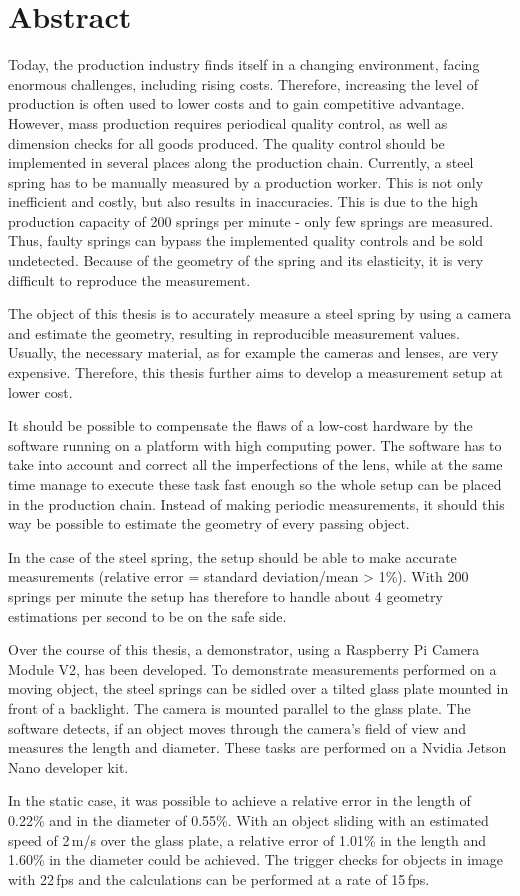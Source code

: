 \chapter*{Abstract}

Today, the production industry finds itself in a changing environment, facing enormous challenges, including rising costs.
Therefore, increasing the level of production is often used to lower costs and to gain competitive advantage. However, mass production requires periodical quality control, as well as dimension checks for all goods produced. 
The quality control should be implemented in several places along the production chain. Currently, a steel spring has to be manually measured by a production worker. This is not only inefficient and costly, but also results in inaccuracies. This is due to the high production capacity of 200 springs per minute - only few springs are measured.
Thus, faulty springs can bypass the implemented quality controls and be sold undetected. Because of the geometry of the spring and its elasticity, it is very difficult to reproduce the measurement.

The object of this thesis is to accurately measure a steel spring by using a camera and estimate the geometry, resulting in reproducible measurement values. Usually, the necessary material, as for example the cameras and lenses, are very expensive. Therefore, this thesis further aims to develop a measurement setup at lower cost. 

It should be possible to compensate the flaws of a low-cost hardware by the software running on a platform with high computing power.
The software has to take into account and correct all the imperfections of the lens, while at the same time manage to execute these task fast enough so the whole setup can be placed in the production chain.
Instead of making periodic measurements, it should this way be possible to estimate the geometry of every passing object.

In the case of the steel spring, the setup should be able to make accurate measurements (relative error = standard deviation/mean > 1\%).
With 200 springs per minute the setup has therefore to handle about 4 geometry estimations per second to be on the safe side.

Over the course of this thesis, a demonstrator, using a Raspberry Pi Camera Module V2, has been developed.
To demonstrate measurements performed on a moving object, the steel springs can be sidled over a tilted glass plate mounted in front of a backlight.
The camera is mounted parallel to the glass plate.
The software detects, if an object moves through the camera's field of view and measures the length and diameter.
These tasks are performed on a Nvidia Jetson Nano developer kit.

In the static case, it was possible to achieve a relative error in the length of 0.22\% and in the diameter of 0.55\%.
With an object sliding with an estimated speed of 2\,m/s over the glass plate, a relative error of 1.01\% in the length and 1.60\% in the diameter could be achieved.
The trigger checks for objects in image with 22\,fps and the calculations can be performed at a rate of 15\,fps. 
